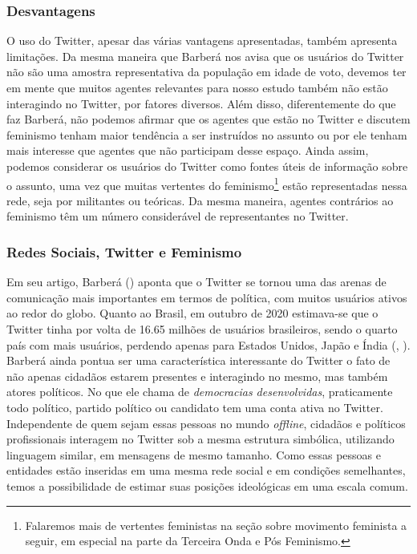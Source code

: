 \documentclass[
	12pt,				%
	openright,			%
	twoside,			%
	a4paper,			%
	english,			%
	brazil				%
	]{abntex2}
\begin{document}
 \subsubsection{Desvantagens}
 O uso do Twitter, apesar das várias vantagens apresentadas, também apresenta limitações. Da mesma maneira que Barberá nos avisa que os usuários do Twitter não são uma amostra representativa da população em idade de voto, devemos ter em mente que muitos agentes relevantes para nosso estudo também não estão interagindo no Twitter, por fatores diversos. Além disso, diferentemente do que faz Barberá, não podemos afirmar que os agentes que estão no Twitter e discutem feminismo tenham maior tendência a ser instruídos no assunto ou por ele tenham mais interesse que agentes que não participam desse espaço. Ainda assim, podemos considerar os usuários do Twitter como fontes úteis de informação sobre o assunto, uma vez que muitas vertentes do feminismo\footnote{Falaremos mais de vertentes feministas na seção sobre movimento feminista a seguir, em especial na parte da Terceira Onda e Pós Feminismo.} estão representadas nessa rede, seja por militantes ou teóricas. Da mesma maneira, agentes contrários ao feminismo têm um número considerável de representantes no Twitter.
 
 \subsubsection{Redes Sociais, Twitter e Feminismo}

 Em seu artigo, Barberá (\citeyear{barbera2015}) aponta que o Twitter se tornou uma das arenas de comunicação mais importantes em termos de política, com muitos usuários ativos ao redor do globo. Quanto ao Brasil, em outubro de 2020 estimava-se que o Twitter tinha por volta de 16.65 milhões de usuários brasileiros, sendo o quarto país com mais usuários, perdendo apenas para Estados Unidos, Japão e Índia (, \citeyear{navarro2020}). Barberá ainda pontua ser uma característica interessante do Twitter o fato de não apenas cidadãos estarem presentes e interagindo no mesmo, mas também atores políticos. No que ele chama de \emph{democracias desenvolvidas}, praticamente todo político, partido político ou candidato tem uma conta ativa no Twitter. Independente de quem sejam essas pessoas no mundo \textit{offline}, cidadãos e políticos profissionais interagem no Twitter sob a mesma estrutura simbólica, utilizando linguagem similar, em mensagens de mesmo tamanho. Como essas pessoas e entidades estão inseridas em uma mesma rede social e em condições semelhantes, temos a possibilidade de estimar suas posições ideológicas em uma escala comum.
 
\end{document}
